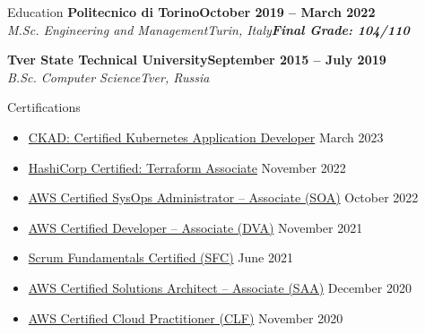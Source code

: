 \documentclass[a4paper]{article}
\newlength{\tabin}
\newlength{\secsep}
\newcommand{\lineunder}{\vspace*{-8pt}\\\hspace*{-6pt}\hrulefill\\\vspace*{-15pt}}
\newcommand{\education}[4]{\vspace{\secsep}\textbf{#1\hfill#2}\\\textit{#3\hfill#4}\vspace{2\secsep}}
\newcommand{\educationwithgrade}[5]{\vspace{\secsep}\textbf{#1\hfill#2}\\\textit{#3\hfill#4}\linebreak\textbf{\textit{#5}}\vspace{2\secsep}}
\newenvironment{tabbedsection}[1]{
  \begin{list}{}{
    \setlength{\itemsep}{0pt}
    \setlength{\labelsep}{0pt}
    \setlength{\labelwidth}{0pt}
    \setlength{\leftmargin}{\tabin}
    \setlength{\rightmargin}{\tabin}
    \setlength{\listparindent}{0pt}
    \setlength{\parsep}{0pt}
    \setlength{\parskip}{0pt}
    \setlength{\partopsep}{0pt}
    \setlength{\topsep}{#1}
  }
  \item[]
}{\end{list}}
\newenvironment{resume_section}[1]{
  \filbreak
  \vspace{2\secsep}
  \textsc{\large#1}
  \lineunder
  \begin{tabbedsection}{\secsep}
}{\end{tabbedsection}}
\newenvironment{subitems}{
  \renewcommand{\labelitemi}{-}
  \begin{itemize}
  \setlength{\labelsep}{1em}
}{\end{itemize}}
\begin{document}
\begin{resume_section}{Education}
  \educationwithgrade{Politecnico di Torino}{October 2019 -- March 2022}{M.Sc. Engineering and Management}{Turin, Italy}{Final Grade: 104/110}

  \education{Tver State Technical University}{September 2015 -- July 2019}{B.Sc. Computer Science}{Tver, Russia}
\end{resume_section}

\begin{resume_section}{Certifications}
  \begin{subitems}
    \item \href{https://www.credly.com/badges/4a65defc-6caa-46cc-bec3-2aed6984ab89}{CKAD: Certified Kubernetes Application Developer} \hfill March 2023
    \item \href{https://www.credly.com/badges/26043bb9-cca6-4c6c-80ae-51a4ef85da84}{HashiCorp Certified: Terraform Associate} \hfill November 2022
    \item \href{https://www.credly.com/badges/849a2bb2-2a38-46ad-9352-613da643d83a}{AWS Certified SysOps Administrator -- Associate (SOA)} \hfill October 2022
    \item \href{https://www.credly.com/badges/4af15df4-f5b2-4d6b-b989-bb47e71c9986}{AWS Certified Developer -- Associate (DVA)} \hfill November 2021
    \item \href{https://www.scrumstudy.com/certification/verify?type=SFC&number=848920}{Scrum Fundamentals Certified (SFC)} \hfill June 2021
    \item \href{https://www.credly.com/badges/52a6f0ff-d46a-4d42-9bb1-ea2b7fb01526}{AWS Certified Solutions Architect -- Associate (SAA)} \hfill December 2020
    \item \href{https://www.credly.com/badges/488ba1a8-a95a-46f5-943b-c275bc7e6178}{AWS Certified Cloud Practitioner (CLF)} \hfill November 2020
  \end{subitems}
\end{resume_section}
\end{document}

